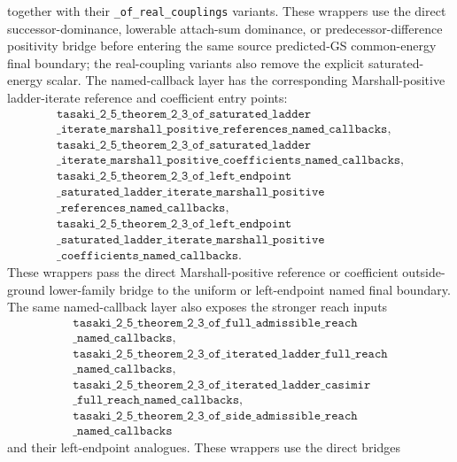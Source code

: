 \documentclass[a4paper,11pt]{article}
\begin{document}
together with their \texttt{\_of\_real\_couplings} variants.  These wrappers
use the direct successor-dominance, lowerable attach-sum dominance, or
predecessor-difference positivity bridge before entering the same source
predicted-GS common-energy final boundary; the real-coupling variants also
remove the explicit saturated-energy scalar.
The named-callback layer has the corresponding Marshall-positive
ladder-iterate reference and coefficient entry points:
\[
\begin{gathered}
\texttt{tasaki\_2\_5\_theorem\_2\_3\_of\_saturated\_ladder}\\
\texttt{\_iterate\_marshall\_positive\_references\_named\_callbacks},\\
\texttt{tasaki\_2\_5\_theorem\_2\_3\_of\_saturated\_ladder}\\
\texttt{\_iterate\_marshall\_positive\_coefficients\_named\_callbacks},\\
\texttt{tasaki\_2\_5\_theorem\_2\_3\_of\_left\_endpoint}\\
\texttt{\_saturated\_ladder\_iterate\_marshall\_positive}\\
\texttt{\_references\_named\_callbacks},\\
\texttt{tasaki\_2\_5\_theorem\_2\_3\_of\_left\_endpoint}\\
\texttt{\_saturated\_ladder\_iterate\_marshall\_positive}\\
\texttt{\_coefficients\_named\_callbacks}.
\end{gathered}
\]
These wrappers pass the direct Marshall-positive reference or coefficient
outside-ground lower-family bridge to the uniform or left-endpoint named final
boundary.
The same named-callback layer also exposes the stronger
reach inputs
\[
\begin{gathered}
\texttt{tasaki\_2\_5\_theorem\_2\_3\_of\_full\_admissible\_reach}\\
\texttt{\_named\_callbacks},\\
\texttt{tasaki\_2\_5\_theorem\_2\_3\_of\_iterated\_ladder\_full\_reach}\\
\texttt{\_named\_callbacks},\\
\texttt{tasaki\_2\_5\_theorem\_2\_3\_of\_iterated\_ladder\_casimir}\\
\texttt{\_full\_reach\_named\_callbacks},\\
\texttt{tasaki\_2\_5\_theorem\_2\_3\_of\_side\_admissible\_reach}\\
\texttt{\_named\_callbacks}
\end{gathered}
\]
and their left-endpoint analogues.  These wrappers use the direct bridges
\end{document}
